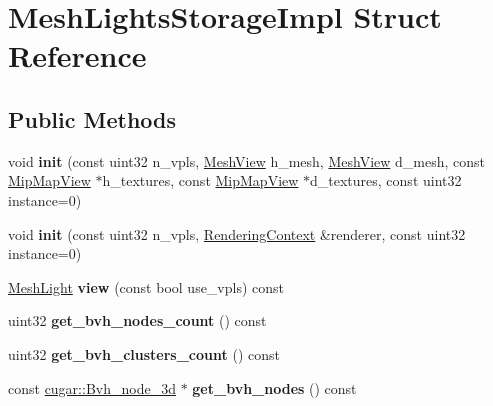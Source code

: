 \hypertarget{struct_mesh_lights_storage_impl}{}\section{Mesh\+Lights\+Storage\+Impl Struct Reference}
\label{struct_mesh_lights_storage_impl}
\subsection*{Public Methods}
\begin{DoxyCompactItemize}
\item 
\mbox{\label{struct_mesh_lights_storage_impl_ad5120a7428c7ede10da0dbc2a3254987}} 
void {\bfseries init} (const uint32 n\+\_\+vpls, \hyperlink{struct_mesh_view}{Mesh\+View} h\+\_\+mesh, \hyperlink{struct_mesh_view}{Mesh\+View} d\+\_\+mesh, const \hyperlink{struct_mip_map_view}{Mip\+Map\+View} $\ast$h\+\_\+textures, const \hyperlink{struct_mip_map_view}{Mip\+Map\+View} $\ast$d\+\_\+textures, const uint32 instance=0)
\item 
\mbox{\label{struct_mesh_lights_storage_impl_a91fc6286d7abd8cebee1040e0ae1a322}} 
void {\bfseries init} (const uint32 n\+\_\+vpls, \hyperlink{struct_rendering_context}{Rendering\+Context} \&renderer, const uint32 instance=0)
\item 
\mbox{\label{struct_mesh_lights_storage_impl_ab090265a9bdac940fb9db9213a5ea531}} 
\hyperlink{struct_mesh_light}{Mesh\+Light} {\bfseries view} (const bool use\+\_\+vpls) const
\item 
\mbox{\label{struct_mesh_lights_storage_impl_ad5a9f5e11ede6e5d550dec5d4789e067}} 
uint32 {\bfseries get\+\_\+bvh\+\_\+nodes\+\_\+count} () const
\item 
\mbox{\label{struct_mesh_lights_storage_impl_aca0071ee2ee49091bca132d57d382774}} 
uint32 {\bfseries get\+\_\+bvh\+\_\+clusters\+\_\+count} () const
\item 
\mbox{\label{struct_mesh_lights_storage_impl_a3aaeaa10890f6118e4b362c151a03cb3}} 
const \hyperlink{structcugar_1_1_bvh__node__3d}{cugar\+::\+Bvh\+\_\+node\+\_\+3d} $\ast$ {\bfseries get\+\_\+bvh\+\_\+nodes} () const

\end{DoxyCompactItemize}
